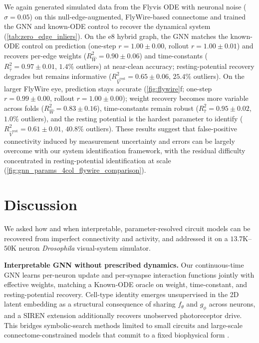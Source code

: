 \documentclass{article}
\begin{document}
We again generated simulated data from the Flyvis ODE with neuronal noise ($\sigma=0.05$) on this null-edge-augmented, FlyWire-based connectome and trained the GNN and known-ODE control to recover the dynamical system (\cref{tab:zero_edge_inliers}). On the e8 hybrid graph, the GNN matches the known-ODE control on prediction (one-step $r = 1.00 \pm 0.00$, rollout $r = 1.00 \pm 0.01$) and recovers per-edge weights ($R^2_{\hat{W}} = 0.90 \pm 0.06$) and time-constants ($R^2_{\hat{\tau}} = 0.97 \pm 0.01$, $1.4\%$ outliers) at near-clean accuracy; resting-potential recovery degrades but remains informative ($R^2_{\hat{V}^{\mathrm{rest}}} = 0.65 \pm 0.06$, $25.4\%$ outliers). On the larger FlyWire eye, prediction stays accurate (\cref{fig:flywire}f; one-step $r = 0.99 \pm 0.00$, rollout $r = 1.00 \pm 0.00$); weight recovery becomes more variable across folds ($R^2_{\hat{W}} = 0.83 \pm 0.16$), time-constants remain robust ($R^2_{\hat{\tau}} = 0.95 \pm 0.02$, $1.0\%$ outliers), and the resting potential is the hardest parameter to identify ($R^2_{\hat{V}^{\mathrm{rest}}} = 0.61 \pm 0.01$, $40.8\%$ outliers). These results suggest that false-positive connectivity induced by measurement uncertainty and errors can be largely overcome with our system identification framework, with the residual difficulty concentrated in resting-potential identification at scale (\cref{fig:gnn_params_4col_flywire_comparison}).


\section{Discussion}

We asked how and when interpretable, parameter-resolved circuit models can be recovered from imperfect connectivity and activity, and addressed it on a $13.7$K--$50$K neuron \emph{Drosophila} visual-system simulator.

\textbf{Interpretable GNN without prescribed dynamics.} Our continuous-time GNN learns per-neuron update and per-synapse interaction functions jointly with effective weights, matching a Known-ODE oracle on weight, time-constant, and resting-potential recovery.
Cell-type identity emerges unsupervised in the 2D latent embedding as a structural consequence of sharing $f_\theta$ and $g_\phi$ across neurons, and a SIREN extension additionally recovers unobserved photoreceptor drive.
This bridges symbolic-search methods limited to small circuits \citep{lueckmann_discovering_2026} and large-scale connectome-constrained models that commit to a fixed biophysical form \citep{mi_connectome-constrained_2021,lappalainen_connectome-constrained_2024,pospisil_fly_2024}.
\end{document}
